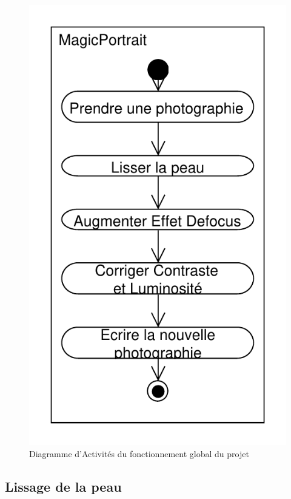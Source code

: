 \documentclass[11pt, french,screen]{report-rd-info}
\begin{document}
\begin{figure}
\centering
\includegraphics[scale=0.5]{Diagrammes/DiagrammeActivites_00_Global}
\caption{Diagramme d'Activités du fonctionnement global du projet}
\label{diag:diagramme00}
\end{figure}





\subsection{Lissage de la peau}
\end{document}
